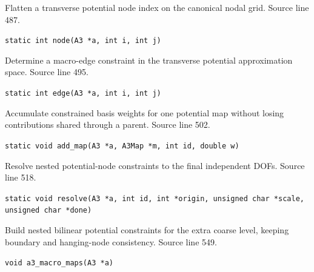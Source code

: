 \begin{description}[style=nextline,leftmargin=0pt,labelindent=0pt,labelwidth=0pt,labelsep=0pt]
\item[\texttt{node}] Flatten a transverse potential node index on the canonical nodal grid. Source line 487.\par
{\small\nolinkurl{static int node(A3 *a, int i, int j)}}
\item[\texttt{edge}] Determine a macro-edge constraint in the transverse potential approximation space. Source line 495.\par
{\small\nolinkurl{static int edge(A3 *a, int i, int j)}}
\item[\texttt{add\_map}] Accumulate constrained basis weights for one potential map without losing contributions shared through a parent. Source line 502.\par
{\small\nolinkurl{static void add_map(A3 *a, A3Map *m, int id, double w)}}
\item[\texttt{resolve}] Resolve nested potential-node constraints to the final independent DOFs. Source line 518.\par
{\small\nolinkurl{static void resolve(A3 *a, int id, int *origin, unsigned char *scale, unsigned char *done)}}
\item[\texttt{a3\_macro\_maps}] Build nested bilinear potential constraints for the extra coarse level, keeping boundary and hanging-node consistency. Source line 549.\par
{\small\nolinkurl{void a3_macro_maps(A3 *a)}}
\end{description}
